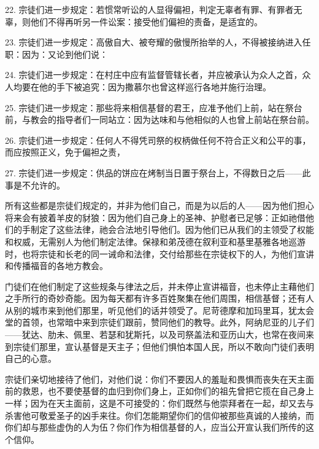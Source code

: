 22. 宗徒们进一步规定：若惯常听讼的人显得偏袒，判定无辜者有罪、有罪者无辜，则他们不得再听另一件讼案：接受他们偏袒的责备，是适宜的。\par

23. 宗徒们进一步规定：高傲自大、被夸耀的傲慢所抬举的人，不得被接纳进入任职：因为：又论到他们说：\par

24. 宗徒们进一步规定：在村庄中应有监督管辖长者，并应被承认为众人之首，众人均要在他的手下被追究：因为撒慕尔也曾这样巡行各地并施行治理。\par

25. 宗徒们进一步规定：那些将来相信基督的君王，应准予他们上前，站在祭台前，与教会的指导者们一同站立：因为达味和与他相似的人也曾上前站在祭台前。\par

26. 宗徒们进一步规定：任何人不得凭司祭的权柄做任何不符合正义和公平的事，而应按照正义，免于偏袒之责，\par

27. 宗徒们进一步规定：供品的饼应在烤制当日置于祭台上，不得数日之后——此事是不允许的。\par

所有这些都是宗徒们规定的，并非为他们自己，而是为以后的人——因为他们担心将来会有披着羊皮的豺狼：因为他们自己身上的圣神、护慰者已足够：正如祂借他们的手制定了这些法律，祂会合法地引导他们。因为他们已从我们的主领受了权能和权威，无需别人为他们制定法律。保禄和弟茂德在叙利亚和基里基雅各地巡游时，也将宗徒和长老的同一诫命和法律，交付给那些在宗徒权下的人，为他们宣讲和传播福音的各地方教会。\par

门徒们在他们制定了这些规条与律法之后，并未停止宣讲福音，也未停止主藉他们之手所行的奇妙奇能。因为每天都有许多百姓聚集在他们周围，相信基督；还有人从别的城市来到他们那里，听见他们的话并领受了。尼苛德摩和加玛里耳，犹太会堂的首领，也常暗中来到宗徒们跟前，赞同他们的教导。此外，阿纳尼亚的儿子们——犹达、肋未、佩里、若瑟和犹斯托，以及司祭盖法和亚历山大，也常在夜间来到宗徒们那里，宣认基督是天主子；但他们惧怕本国人民，所以不敢向门徒们表明自己的心意。\par

宗徒们亲切地接待了他们，对他们说：你们不要因人的羞耻和畏惧而丧失在天主面前的救恩，也不要使基督的血归到你们身上，正如你们的祖先曾把它揽在自己身上一样；因为在天主面前，这是不可接受的：你们既然与他崇拜者在一起，却又去与杀害他可敬爱圣子的凶手来往。你们怎能期望你们的信仰被那些真诚的人接纳，而你们却与那些虚伪的人为伍？你们作为相信基督的人，应当公开宣认我们所传的这个信仰。\par

